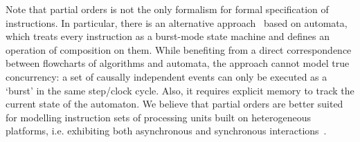 Note that partial orders is not the only formalism for formal specification
of instructions. In particular, there is an alternative approach~\cite{1994_baranov_book}
based on automata, which treats every instruction as a burst-mode
state machine and defines an operation of composition on them. While
benefiting from a direct correspondence between flowcharts of algorithms
and automata, the approach cannot model true concurrency: a set of
causally independent events can only be executed as a `burst' in
the same step/clock cycle. Also, it requires explicit memory to track
the current state of the automaton. We believe that partial orders
are better suited for modelling instruction sets of processing units
built on heterogeneous platforms, i.e. exhibiting both asynchronous
and synchronous interactions~\cite{2013_mokhov_ieee}.
